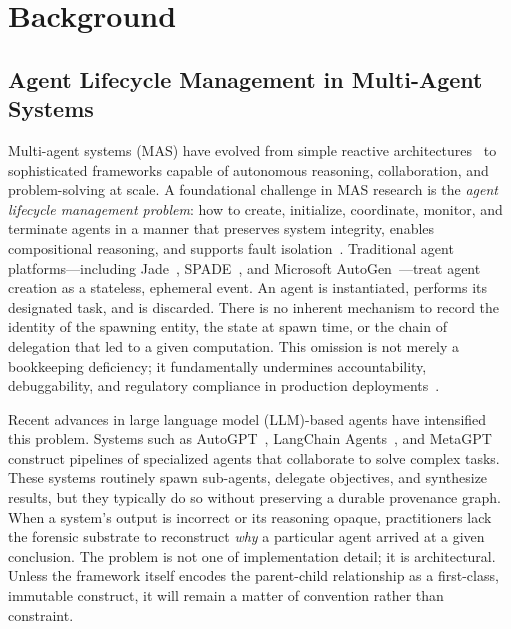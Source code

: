 \section{Background}

\subsection{Agent Lifecycle Management in Multi-Agent Systems}

Multi-agent systems (MAS) have evolved from simple reactive architectures~\cite{brooks1991intelligence} to sophisticated frameworks capable of autonomous reasoning, collaboration, and problem-solving at scale. A foundational challenge in MAS research is the \emph{agent lifecycle management problem}: how to create, initialize, coordinate, monitor, and terminate agents in a manner that preserves system integrity, enables compositional reasoning, and supports fault isolation~\cite{horling2004survey,wooldridge2009multiagent}. Traditional agent platforms---including Jade~\cite{bellifemine2007jade}, SPADE~\cite{palanque2012spade}, and Microsoft AutoGen~\cite{wu2023autogen}---treat agent creation as a stateless, ephemeral event. An agent is instantiated, performs its designated task, and is discarded. There is no inherent mechanism to record the identity of the spawning entity, the state at spawn time, or the chain of delegation that led to a given computation. This omission is not merely a bookkeeping deficiency; it fundamentally undermines accountability, debuggability, and regulatory compliance in production deployments~\cite{singh2019blockchain}.

Recent advances in large language model (LLM)-based agents have intensified this problem. Systems such as AutoGPT~\cite{richards2023autogen}, LangChain Agents~\cite{chase2022langchain}, and MetaGPT~\cite{hong2023metagpt} construct pipelines of specialized agents that collaborate to solve complex tasks. These systems routinely spawn sub-agents, delegate objectives, and synthesize results, but they typically do so without preserving a durable provenance graph. When a system's output is incorrect or its reasoning opaque, practitioners lack the forensic substrate to reconstruct \emph{why} a particular agent arrived at a given conclusion. The problem is not one of implementation detail; it is architectural. Unless the framework itself encodes the parent-child relationship as a first-class, immutable construct, it will remain a matter of convention rather than constraint.

